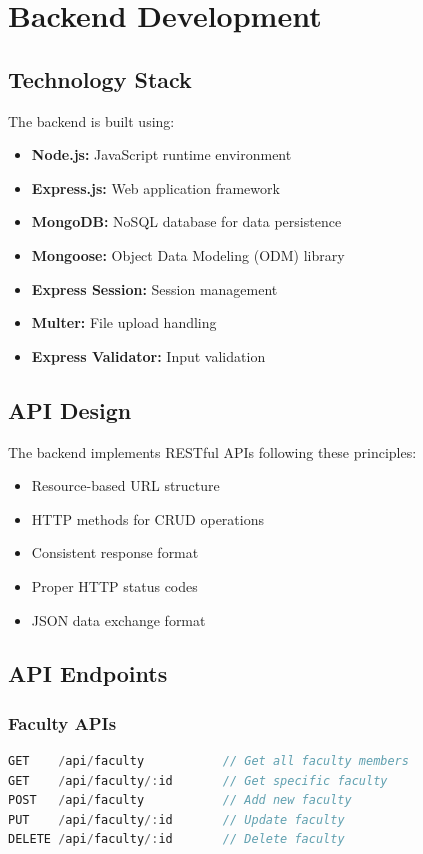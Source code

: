 \documentclass[12pt,a4paper]{report}
\begin{document}
\chapter{Backend Development}
\label{chap:backend}

\section{Technology Stack}
The backend is built using:
\begin{itemize}
    \item \textbf{Node.js:} JavaScript runtime environment
    \item \textbf{Express.js:} Web application framework
    \item \textbf{MongoDB:} NoSQL database for data persistence
    \item \textbf{Mongoose:} Object Data Modeling (ODM) library
    \item \textbf{Express Session:} Session management
    \item \textbf{Multer:} File upload handling
    \item \textbf{Express Validator:} Input validation
\end{itemize}

\section{API Design}
The backend implements RESTful APIs following these principles:
\begin{itemize}
    \item Resource-based URL structure
    \item HTTP methods for CRUD operations
    \item Consistent response format
    \item Proper HTTP status codes
    \item JSON data exchange format
\end{itemize}

\section{API Endpoints}
\subsection{Faculty APIs}
\begin{lstlisting}[language=JavaScript, caption=Faculty API Endpoints]
GET    /api/faculty           // Get all faculty members
GET    /api/faculty/:id       // Get specific faculty
POST   /api/faculty           // Add new faculty
PUT    /api/faculty/:id       // Update faculty
DELETE /api/faculty/:id       // Delete faculty
\end{lstlisting}
\end{document}
